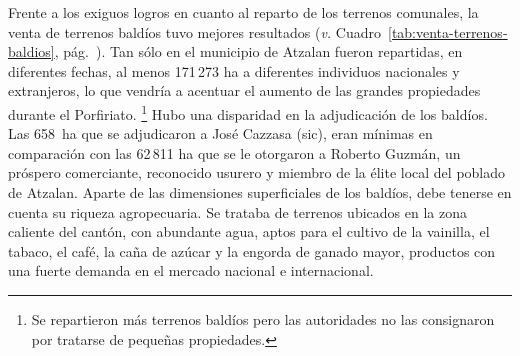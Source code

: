 \documentclass[14pt,twoside,final]{extbook} %
\let\oldfootnote\footnote
\renewcommand\footnote[1]{%
\oldfootnote{\hspace{1mm}#1}}
\newcommand{\llabel}[1]{\hypertarget{llineno:#1}{\linelabel{#1}}}
\begin{document}
\begin{linenumbers}
\rightlinenumbers %
\modulolinenumbers[4] %
Frente a los exiguos logros en cuanto al reparto de los terrenos comunales, la venta de terrenos baldíos tuvo mejores resultados (\emph{v.} Cuadro~\ref{tab:venta-terrenos-baldios}, pág.~\pageref{tab:venta-terrenos-baldios}). Tan sólo en el municipio de Atzalan fueron repartidas, en diferentes fechas, al menos 171\,273 ha\llabel{cuatro} a diferentes individuos nacionales y extranjeros, lo que vendría a acentuar el aumento de las grandes propiedades durante el Porfiriato.\footnote{Se repartieron más terrenos baldíos pero las autoridades no las consignaron por tratarse de pequeñas propiedades.} Hubo una disparidad en la adjudicación de los baldíos. Las 658~ha\llabel{siete} que se adjudicaron a José Cazzasa (sic), eran mínimas en comparación con las 62\,811 ha\llabel{ocho} que se le otorgaron a Roberto Guzmán, un próspero comerciante, reconocido usurero y miembro de la élite local del poblado de Atzalan. Aparte de las dimensiones superficiales de los baldíos, debe tenerse en cuenta su riqueza agropecuaria. Se trataba de terrenos ubicados en la zona caliente del cantón, con abundante agua, aptos para el cultivo de la vainilla, el tabaco, el café, la caña de azúcar y la engorda de ganado mayor, productos con una fuerte demanda en el mercado nacional e internacional.
\end{linenumbers}
\end{document}

